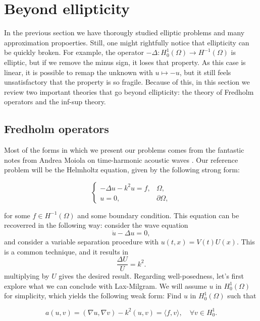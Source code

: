 \documentclass{article}
\begin{document}
\section{Beyond ellipticity}\label{section:beyond-ellipticity}
In the previous section we have thorougly studied elliptic problems and many approximation propoerties. Still, one might rightfully notice that ellipticity can be quickly broken. For example, the operator $-\Delta: H_0^1(\Omega)\to H^{-1}(\Omega)$ is elliptic, but if we remove the minus sign, it loses that property. As this case is linear, it is possible to remap the unknown with $u\mapsto -u$, but it still feels unsatisfactory that the property is so fragile. Because of this, in this section we review two important theories that go beyond ellipticity: the theory of Fredholm operators and the inf-sup theory.

\subsection{Fredholm operators}

Most of the forms in which we present our problems comes from the fantastic notes from Andrea Moiola on time-harmonic acoustic waves \cite{moiola2021scattering}. Our reference problem will be the Helmholtz equation, given by the following strong form:

\[
\left\{
\begin{array}{rc}
    -\Delta u -k^2 u = f, &\Omega,\\
    u=0, &\partial\Omega,
\end{array}\right.
\]

for some $f\in H^{-1}(\Omega)$ and some boundary condition. This equation can be recoverred in the following way: consider the wave equation
    $$ \ddot u - \Delta u = 0, $$
and consider a variable separation procedure with $u(t,x) = V(t)U(x)$. This is a common technique, and it results in 
    $$ \frac{\Delta U}{U} = k^2.$$
multiplying by $U$ gives the desired result. Regarding well-posedness, let's first explore what we can conclude with Lax-Milgram. We will assume $u$ in $H_0^1(\Omega)$ for simplicity, which yields the following weak form: Find $u$ in $H_0^1(\Omega)$ such that

\[
a(u,v) = (\nabla u, \nabla v) - k^2(u,v) = \langle f, v\rangle, \quad \forall v\in H_0^1.
\]
\end{document}
